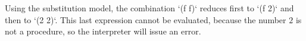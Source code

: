 Using the substitution model, the combination `(f f)` reduces first to `(f 2)` and then to `(2 2)`.  This last expression cannot be evaluated, because the number $2$ is not a procedure, so the interpreter will issue an error.  
